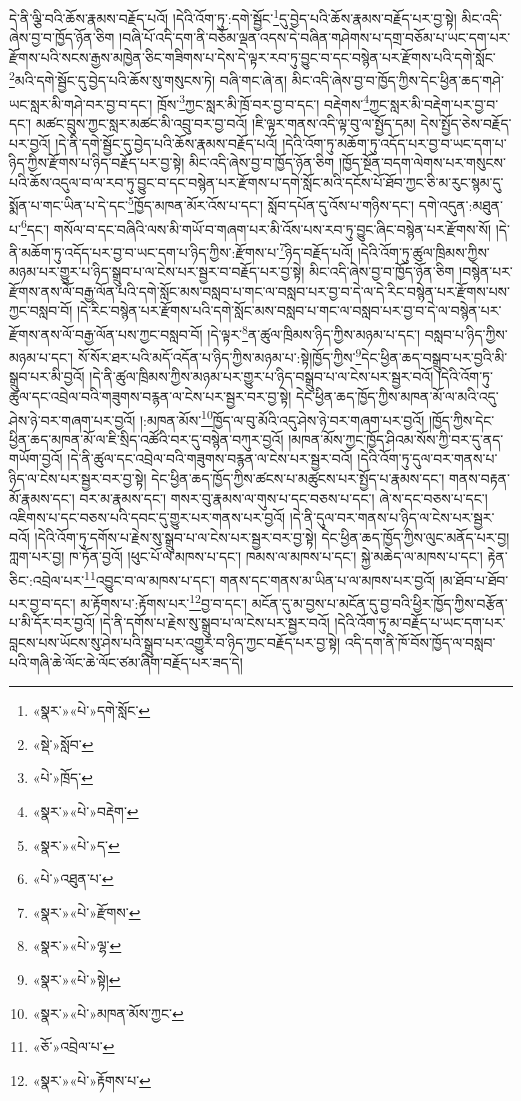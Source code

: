 དེ་ནི་ལྕི་བའི་ཆོས་རྣམས་བརྗོད་པའོ། །དེའི་འོག་ཏུ་:དགེ་སྦྱོང་\footnote{«སྣར་»«པེ་»དགེ་སློང་}དུ་བྱེད་པའི་ཆོས་རྣམས་བརྗོད་པར་བྱ་སྟེ། མིང་འདི་ཞེས་བྱ་བ་ཁྱོད་ཉོན་ཅིག །བཞི་པོ་འདི་དག་ནི་བཅོམ་ལྡན་འདས་དེ་བཞིན་གཤེགས་པ་དགྲ་བཅོམ་པ་ཡང་དག་པར་རྫོགས་པའི་སངས་རྒྱས་མཁྱེན་ཅིང་གཟིགས་པ་དེས་དེ་ལྟར་རབ་ཏུ་བྱུང་བ་དང་བསྙེན་པར་རྫོགས་པའི་དགེ་སློང་\footnote{«སྡེ་»སློབ་}མའི་དགེ་སྦྱོང་དུ་བྱེད་པའི་ཆོས་སུ་གསུངས་ཏེ། བཞི་གང་ཞེ་ན། མིང་འདི་ཞེས་བྱ་བ་ཁྱོད་ཀྱིས་དེང་ཕྱིན་ཆད་གཤེ་ཡང་སླར་མི་གཤེ་བར་བྱ་བ་དང་། ཁྲོས་\footnote{«པེ་»ཁྲོད་}ཀྱང་སླར་མི་ཁྲོ་བར་བྱ་བ་དང་། བརྡེགས་\footnote{«སྣར་»«པེ་»བརྡེག་}ཀྱང་སླར་མི་བརྡེག་པར་བྱ་བ་དང་། མཚང་བྲུས་ཀྱང་སླར་མཚང་མི་འབྲུ་བར་བྱ་བའོ། །ཇི་ལྟར་གནས་འདི་ལྟ་བུ་ལ་སྤྱོད་དམ། དེས་སྤྱོད་ཅེས་བརྗོད་པར་བྱའོ། །དེ་ནི་དགེ་སྦྱོང་དུ་བྱེད་པའི་ཆོས་རྣམས་བརྗོད་པའོ། །དེའི་འོག་ཏུ་མཆོག་ཏུ་འདོད་པར་བྱ་བ་ཡང་དག་པ་ཉིད་ཀྱིས་རྫོགས་པ་ཉིད་བརྗོད་པར་བྱ་སྟེ། མིང་འདི་ཞེས་བྱ་བ་ཁྱོད་ཉོན་ཅིག །ཁྱོད་སྔོན་བདག་ལེགས་པར་གསུངས་པའི་ཆོས་འདུལ་བ་ལ་རབ་ཏུ་བྱུང་བ་དང་བསྙེན་པར་རྫོགས་པ་དགེ་སློང་མའི་དངོས་པོ་ཐོབ་ཀྱང་ཅི་མ་རུང་སྙམ་དུ་སྨོན་པ་གང་ཡིན་པ་དེ་དང་\footnote{«སྣར་»«པེ་»ད་}ཁྱོད་མཁན་མོར་འོས་པ་དང་། སློབ་དཔོན་དུ་འོས་པ་གཉིས་དང་། དགེ་འདུན་:མཐུན་པ་\footnote{«པེ་»འཐུན་པ་}དང་། གསོལ་བ་དང་བཞིའི་ལས་མི་གཡོ་བ་གཞག་པར་མི་འོས་པས་རབ་ཏུ་བྱུང་ཞིང་བསྙེན་པར་རྫོགས་སོ། །དེ་ནི་མཆོག་ཏུ་འདོད་པར་བྱ་བ་ཡང་དག་པ་ཉིད་ཀྱིས་:རྫོགས་པ་\footnote{«སྣར་»«པེ་»རྫོགས་}ཉིད་བརྗོད་པའོ། །དེའི་འོག་ཏུ་ཚུལ་ཁྲིམས་ཀྱིས་མཉམ་པར་གྱུར་པ་ཉིད་སྒྲུབ་པ་ལ་ངེས་པར་སྦྱར་བ་བརྗོད་པར་བྱ་སྟེ། མིང་འདི་ཞེས་བྱ་བ་ཁྱོད་ཉོན་ཅིག །བསྙེན་པར་རྫོགས་ནས་ལོ་བརྒྱ་ལོན་པའི་དགེ་སློང་མས་བསླབ་པ་གང་ལ་བསླབ་པར་བྱ་བ་དེ་ལ་དེ་རིང་བསྙེན་པར་རྫོགས་པས་ཀྱང་བསླབ་བོ། །དེ་རིང་བསྙེན་པར་རྫོགས་པའི་དགེ་སློང་མས་བསླབ་པ་གང་ལ་བསླབ་པར་བྱ་བ་དེ་ལ་བསྙེན་པར་རྫོགས་ནས་ལོ་བརྒྱ་ལོན་པས་ཀྱང་བསླབ་བོ། །དེ་ལྟར་\footnote{«སྣར་»«པེ་»ལྷ་}ན་ཚུལ་ཁྲིམས་ཉིད་ཀྱིས་མཉམ་པ་དང་། བསླབ་པ་ཉིད་ཀྱིས་མཉམ་པ་དང་། སོ་སོར་ཐར་པའི་མདོ་འདོན་པ་ཉིད་ཀྱིས་མཉམ་པ་:སྟེ།ཁྱོད་ཀྱིས་\footnote{«སྣར་»«པེ་»སྟེ།}དེང་ཕྱིན་ཆད་བསྒྲུབ་པར་བྱའི་མི་སྒྲུབ་པར་མི་བྱའོ། །དེ་ནི་ཚུལ་ཁྲིམས་ཀྱིས་མཉམ་པར་གྱུར་པ་ཉིད་བསྒྲུབ་པ་ལ་ངེས་པར་སྦྱར་བའོ། །དེའི་འོག་ཏུ་ཚུལ་དང་འབྲེལ་བའི་གཟུགས་བརྙན་ལ་ངེས་པར་སྦྱར་བར་བྱ་སྟེ། དེང་ཕྱིན་ཆད་ཁྱོད་ཀྱིས་མཁན་མོ་ལ་མའི་འདུ་ཤེས་ཉེ་བར་གཞག་པར་བྱའོ། །:མཁན་མོས་\footnote{«སྣར་»«པེ་»མཁན་མོས་ཀྱང་}ཁྱོད་ལ་བུ་མོའི་འདུ་ཤེས་ཉེ་བར་གཞག་པར་བྱའོ། །ཁྱོད་ཀྱིས་དེང་ཕྱིན་ཆད་མཁན་མོ་ལ་ཇི་སྲིད་འཚོའི་བར་དུ་བསྙེན་བཀུར་བྱའོ། །མཁན་མོས་ཀྱང་ཁྱོད་ཤིའམ་སོས་ཀྱི་བར་དུ་ནད་གཡོག་བྱའོ། །དེ་ནི་ཚུལ་དང་འབྲེལ་བའི་གཟུགས་བརྙན་ལ་ངེས་པར་སྦྱར་བའོ། །དེའི་འོག་ཏུ་དུལ་བར་གནས་པ་ཉིད་ལ་ངེས་པར་སྦྱར་བར་བྱ་སྟེ། དེང་ཕྱིན་ཆད་ཁྱོད་ཀྱིས་ཚངས་པ་མཚུངས་པར་སྤྱོད་པ་རྣམས་དང་། གནས་བརྟན་མོ་རྣམས་དང་། བར་མ་རྣམས་དང་། གསར་བུ་རྣམས་ལ་གུས་པ་དང་བཅས་པ་དང་། ཞེ་ས་དང་བཅས་པ་དང་། འཇིགས་པ་དང་བཅས་པའི་དབང་དུ་གྱུར་པར་གནས་པར་བྱའོ། །དེ་ནི་དུལ་བར་གནས་པ་ཉིད་ལ་ངེས་པར་སྦྱར་བའོ། །དེའི་འོག་ཏུ་དགོས་པ་རྗེས་སུ་སྒྲུབ་པ་ལ་ངེས་པར་སྦྱར་བར་བྱ་སྟེ། དེང་ཕྱིན་ཆད་ཁྱོད་ཀྱིས་ལུང་མནོད་པར་བྱ། ཀླག་པར་བྱ། ཁ་ཏོན་བྱའོ། །ཕུང་པོ་ལ་མཁས་པ་དང་། ཁམས་ལ་མཁས་པ་དང་། སྐྱེ་མཆེད་ལ་མཁས་པ་དང་། རྟེན་ཅིང་:འབྲེལ་པར་\footnote{«ཅོ་»འབྲེལ་པ་}འབྱུང་བ་ལ་མཁས་པ་དང་། གནས་དང་གནས་མ་ཡིན་པ་ལ་མཁས་པར་བྱའོ། །མ་ཐོབ་པ་ཐོབ་པར་བྱ་བ་དང་། མ་རྟོགས་པ་:རྟོགས་པར་\footnote{«སྣར་»«པེ་»རྟོགས་པ་}བྱ་བ་དང་། མངོན་དུ་མ་བྱས་པ་མངོན་དུ་བྱ་བའི་ཕྱིར་ཁྱོད་ཀྱིས་བརྩོན་པ་མི་དོར་བར་བྱའོ། །དེ་ནི་དགོས་པ་རྗེས་སུ་སྒྲུབ་པ་ལ་ངེས་པར་སྦྱར་བའོ། །དེའི་འོག་ཏུ་མ་བརྗོད་པ་ཡང་དག་པར་བླངས་པས་ཡོངས་སུ་ཤེས་པའི་སྒྲུབ་པར་འགྱུར་བ་ཉིད་ཀྱང་བརྗོད་པར་བྱ་སྟེ། འདི་དག་ནི་ཁོ་བོས་ཁྱོད་ལ་བསླབ་པའི་གཞི་ཆེ་ལོང་ཆེ་ལོང་ཙམ་ཞིག་བརྗོད་པར་ཟད་དེ། 